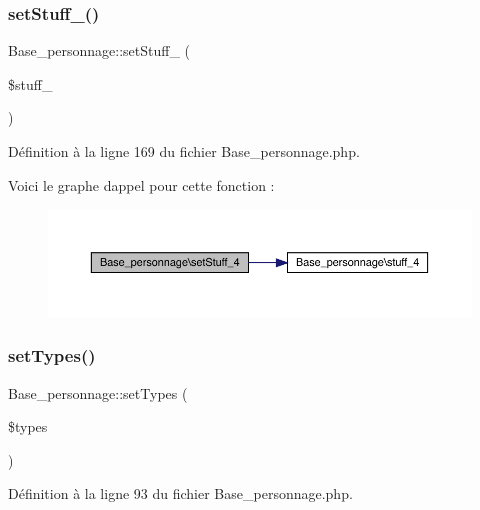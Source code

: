 \subsubsection{\texorpdfstring{set\+Stuff\+\_()}{setStuff\_4()}}
{\footnotesize\ttfamily Base\+\_\+personnage\+::set\+Stuff\+\_ (\begin{DoxyParamCaption}\item[{}]{\$stuff\+\_ }\end{DoxyParamCaption})}



Définition à la ligne 169 du fichier Base\+\_\+personnage.\+php.

Voici le graphe d\textquotesingle{}appel pour cette fonction \+:\nopagebreak
\begin{figure}[H]
\begin{center}
\leavevmode
\includegraphics[width=350pt]{class_base__personnage_a19983536bab7533d81e56f5ca2934f2c_cgraph}
\end{center}
\end{figure}
\mbox{\label{class_base__personnage_aa3d0dbf11be8d919e4faa6e7f110375e}} 
\subsubsection{\texorpdfstring{set\+Types()}{setTypes()}}
{\footnotesize\ttfamily Base\+\_\+personnage\+::set\+Types (\begin{DoxyParamCaption}\item[{}]{\$types }\end{DoxyParamCaption})}



Définition à la ligne 93 du fichier Base\+\_\+personnage.\+php.

